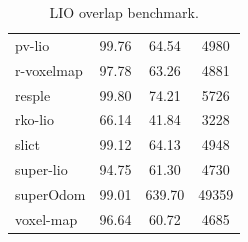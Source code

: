 \begin{table}[]
\begin{tabular}{lccc}
pv-lio & 99.76 & 64.54 & 4980 \\
r-voxelmap & 97.78 & 63.26 & 4881 \\
resple & 99.80 & 74.21 & 5726 \\
rko-lio & 66.14 & 41.84 & 3228 \\
slict & 99.12 & 64.13 & 4948 \\
super-lio & 94.75 & 61.30 & 4730 \\
superOdom & 99.01 & 639.70 & 49359 \\
voxel-map & 96.64 & 60.72 & 4685 \\
\end{tabular}
\caption{LIO overlap benchmark.}
\label{tab:lio_overlap}
\end{table}